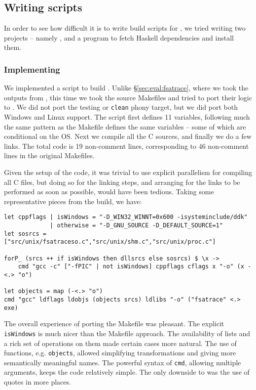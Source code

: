 \subsection{Writing \Rattle scripts}

In order to see how difficult it is to write build scripts for \Rattle, we tried writing two projects -- namely \Fsatrace, and a program to fetch Haskell dependencies and install them.

\subsubsection{Implementing \Fsatrace}

We implemented a \Rattle script to build \Fsatrace. Unlike \S\ref{sec:eval:fsatrace}, where we took the outputs from \Make, this time we took the source Makefiles and tried to port their logic to \Rattle. We did not port the testing or \texttt{clean} phony target, but we did port both Windows and Linux support. The script first defines 11 variables, following much the same pattern as the Makefile defines the same variables -- some of which are conditional on the OS. Next we compile all the C sources, and finally we do a few links. The total code is 19 non-comment lines, corresponding to 46 non-comment lines in the original Makefiles.

Given the setup of the code, it was trivial to use explicit parallelism for compiling all C files, but doing so for the linking steps, and arranging for the links to be performed as soon as possible, would have been tedious. Taking some representative pieces from the build, we have:

\begin{verbatim}
let cppflags | isWindows = "-D_WIN32_WINNT=0x600 -isysteminclude/ddk"
             | otherwise = "-D_GNU_SOURCE -D_DEFAULT_SOURCE=1"
let sosrcs = ["src/unix/fsatraceso.c","src/unix/shm.c","src/unix/proc.c"]

forP_ (srcs ++ if isWindows then dllsrcs else sosrcs) $ \x ->
    cmd "gcc -c" ["-fPIC" | not isWindows] cppflags cflags x "-o" (x -<.> "o")

let objects = map (-<.> "o")
cmd "gcc" ldflags ldobjs (objects srcs) ldlibs "-o" ("fsatrace" <.> exe)
\end{verbatim}

The overall experience of porting the Makefile was pleasant. The explicit \texttt{isWindows} is much nicer than the Makefile approach. The  availability of lists and a rich set of operations on them made certain cases more natural. The use of functions, e.g. \texttt{objects}, allowed simplifying transformations and giving more semantically meaningful names. The powerful syntax of \texttt{cmd}, allowing multiple arguments, keeps the code relatively simple. The only downside to \Make was the use of quotes in more places.

